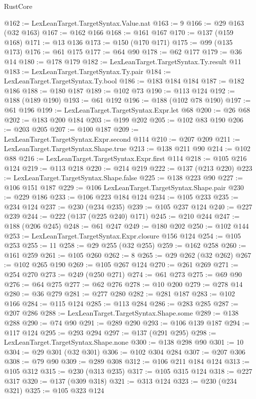\begin{lexlean}{RustCore}
\begin{coremodule}
{\begin{coremodule}
{{{{{{{{{{{{{{{{{{{{{{{{{{{{{{{{{{{{{{{{{{{{{{{@162 := LexLeanTarget.TargetSyntax.Value.nat
@163 := 9
@166 := @29 @163 (@32 @163)
@167 := @162 @166
@168 := @161 @167
@170 := @137 (@159 @168)
@171 := @13 @136
@173 := @150 (@170 @171)
@175 := @99 (@135 @173)
@176 := @61 @175
@177 := @64 @90
@178 := @62 @177
@179 := @36 @14
@180 := @178 @179
@182 := LexLeanTarget.TargetSyntax.Ty.result @11
@183 := LexLeanTarget.TargetSyntax.Ty.pair
@184 := LexLeanTarget.TargetSyntax.Ty.bool
@186 := @183 @184 @184
@187 := @182 @186
@188 := @180 @187
@189 := @102 @73
@190 := @113 @124
@192 := @188 (@189 @190)
@193 := @61 @192
@196 := @188 (@102 @78 @190)
@197 := @61 @196
@199 := LexLeanTarget.TargetSyntax.Expr.let @68
@200 := @26 @68
@202 := @183 @200 @184
@203 := @199 @202
@205 := @102 @83 @190
@206 := @203 @205
@207 := @100 @187
@209 := LexLeanTarget.TargetSyntax.Expr.second @114
@210 := @207 @209
@211 := LexLeanTarget.TargetSyntax.Shape.true
@213 := @138 @211 @90
@214 := @102 @88
@216 := LexLeanTarget.TargetSyntax.Expr.first @114
@218 := @105 @216 @124
@219 := @113 @218
@220 := @214 @219
@222 := @137 (@213 @220)
@223 := LexLeanTarget.TargetSyntax.Shape.false
@225 := @138 @223 @90
@227 := @106 @151 @187
@229 := @106 LexLeanTarget.TargetSyntax.Shape.pair
@230 := @229 @186
@233 := @106 @223 @184 @124
@234 := @105 @233
@235 := @234 @124
@237 := @230 (@234 @235)
@239 := @105 @237 @124
@240 := @227 @239
@244 := @222 (@137 (@225 @240) @171)
@245 := @210 @244
@247 := @188 (@206 @245)
@248 := @61 @247
@249 := @180 @202
@250 := @102 @144
@253 := LexLeanTarget.TargetSyntax.Expr.closure @156 @124
@254 := @105 @253
@255 := 11
@258 := @29 @255 (@32 @255)
@259 := @162 @258
@260 := @161 @259
@261 := @105 @260
@262 := 8
@265 := @29 @262 (@32 @262)
@267 := @102 @265 @190
@269 := @105 @267 @124
@270 := @261 @269
@271 := @254 @270
@273 := @249 (@250 @271)
@274 := @61 @273
@275 := @69 @90
@276 := @64 @275
@277 := @62 @276
@278 := @10 @200
@279 := @278 @14
@280 := @36 @279
@281 := @277 @280
@282 := @281 @187
@283 := @102 @166
@284 := @115 @124
@285 := @113 @284
@286 := @283 @285
@287 := @207 @286
@288 := LexLeanTarget.TargetSyntax.Shape.some
@289 := @138 @288
@290 := @74 @90
@291 := @289 @290
@293 := @106 @139 @187
@294 := @117 @124
@295 := @293 @294
@297 := @137 (@291 @295)
@298 := LexLeanTarget.TargetSyntax.Shape.none
@300 := @138 @298 @90
@301 := 10
@304 := @29 @301 (@32 @301)
@306 := @102 @304 @284
@307 := @207 @306
@308 := @79 @90
@309 := @289 @308
@312 := @106 @211 @184 @124
@313 := @105 @312
@315 := @230 (@313 @235)
@317 := @105 @315 @124
@318 := @227 @317
@320 := @137 (@309 @318)
@321 := @313 @124
@323 := @230 (@234 @321)
@325 := @105 @323 @124
}}}}}}}}}}}}}}}}}}}}}}}}}}}}}}}}}}}}}}}}}}}}}}}
\end{coremodule}}
\end{coremodule}
\end{lexlean}
